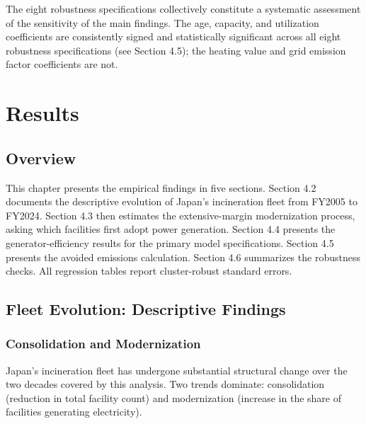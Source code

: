 \documentclass[12pt,a4paper]{article}
\begin{document}
The eight robustness specifications collectively constitute a systematic assessment of the sensitivity of the main findings. The age, capacity, and utilization coefficients are consistently signed and statistically significant across all eight robustness specifications (see Section 4.5); the heating value and grid emission factor coefficients are not.


\clearpage
\section{Results}

\subsection{Overview}

This chapter presents the empirical findings in five sections. Section 4.2 documents the descriptive evolution of Japan's incineration fleet from FY2005 to FY2024. Section 4.3 then estimates the extensive-margin modernization process, asking which facilities first adopt power generation. Section 4.4 presents the generator-efficiency results for the primary model specifications. Section 4.5 presents the avoided emissions calculation. Section 4.6 summarizes the robustness checks. All regression tables report cluster-robust standard errors.

\subsection{Fleet Evolution: Descriptive Findings}

\subsubsection{Consolidation and Modernization}

Japan's incineration fleet has undergone substantial structural change over the two decades covered by this analysis. Two trends dominate: consolidation (reduction in total facility count) and modernization (increase in the share of facilities generating electricity).
\end{document}
